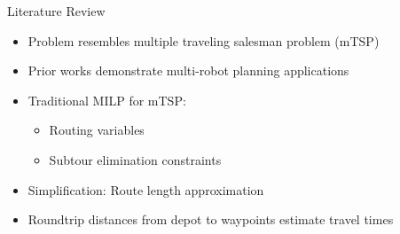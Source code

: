 \documentclass[11pt,xcolor={dvipsnames},hyperref={pdftex,pdfpagemode=UseNone,hidelinks,pdfdisplaydoctitle=true},usepdftitle=false]{beamer}
\begin{document}
    \begin{frame}{Literature Review}
      \begin{itemize}
        \item Problem resembles multiple traveling salesman problem (mTSP)
        \item Prior works demonstrate multi-robot planning applications
        \item Traditional MILP for mTSP:
          \begin{itemize}
            \item Routing variables 
            \item Subtour elimination constraints
          \end{itemize}
        \item Simplification: Route length approximation
        \item Roundtrip distances from depot to waypoints estimate travel times
      \end{itemize}
    \end{frame}
\end{document}

